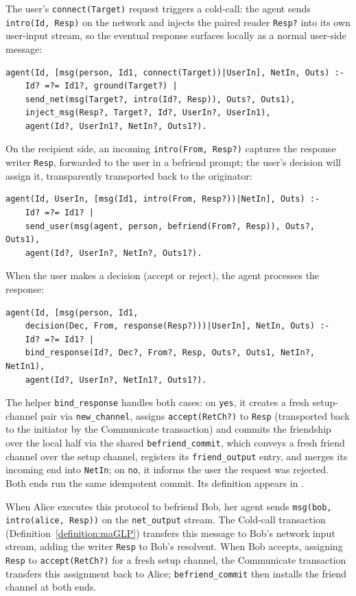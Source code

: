 The user's \verb|connect(Target)| request triggers a cold-call: the agent sends \verb|intro(Id, Resp)| on the network and injects the paired reader \verb|Resp?| into its own user-input stream, so the eventual response surfaces locally as a normal user-side message:
\begin{verbatim}
agent(Id, [msg(person, Id1, connect(Target))|UserIn], NetIn, Outs) :-
    Id? =?= Id1?, ground(Target?) |
    send_net(msg(Target?, intro(Id?, Resp)), Outs?, Outs1),
    inject_msg(Resp?, Target?, Id?, UserIn?, UserIn1),
    agent(Id?, UserIn1?, NetIn?, Outs1?).
\end{verbatim}
On the recipient side, an incoming \verb|intro(From, Resp?)| captures the response writer \verb|Resp|, forwarded to the user in a befriend prompt; the user's decision will assign it, transparently transported back to the originator:
\begin{verbatim}
agent(Id, UserIn, [msg(Id1, intro(From, Resp?))|NetIn], Outs) :-
    Id? =?= Id1? |
    send_user(msg(agent, person, befriend(From?, Resp)), Outs?, Outs1),
    agent(Id?, UserIn?, NetIn?, Outs1?).
\end{verbatim}
When the user makes a decision (accept or reject), the agent processes the response:
\begin{verbatim}
agent(Id, [msg(person, Id1,
    decision(Dec, From, response(Resp?)))|UserIn], NetIn, Outs) :-
    Id? =?= Id1? |
    bind_response(Id?, Dec?, From?, Resp, Outs?, Outs1, NetIn?, NetIn1),
    agent(Id?, UserIn?, NetIn1?, Outs1?).
\end{verbatim}
The helper \verb|bind_response| handles both cases: on \verb|yes|, it creates a fresh setup-channel pair via \verb|new_channel|, assigns \verb|accept(RetCh?)| to \verb|Resp| (transported back to the initiator by the Communicate transaction) and commits the friendship over the local half via the shared \verb|befriend_commit|, which conveys a fresh friend channel over the setup channel, registers its \verb|friend_output| entry, and merges its incoming end into \verb|NetIn|; on \verb|no|, it informs the user the request was rejected.  Both ends run the same idempotent commit.  Its definition appears in .

When Alice executes this protocol to befriend Bob, her agent sends \verb|msg(bob, intro(alice, Resp))| on the \verb|net_output| stream. The Cold-call transaction (Definition~\ref{definition:maGLP}) transfers this message to Bob's network input stream, adding the writer \verb|Resp| to Bob's resolvent. When Bob accepts, assigning \verb|Resp| to \verb|accept(RetCh?)| for a fresh setup channel, the Communicate transaction transfers this assignment back to Alice; \verb|befriend_commit| then installs the friend channel at both ends.

